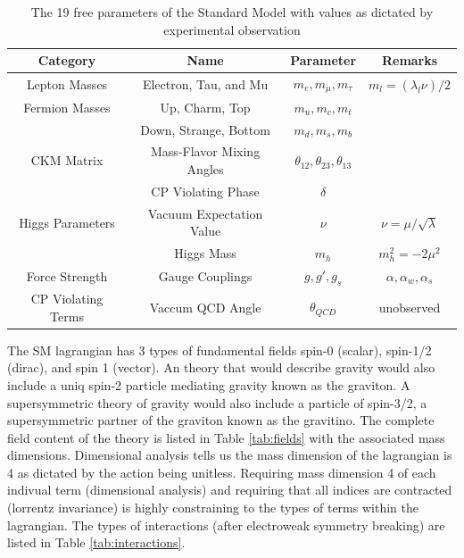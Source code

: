 \begin{center}
\begin{table}[]
\begin{center}
\caption{The 19 free parameters of the Standard Model with values as dictated by experimental observation}
\begin{tabular}{cccc}
\textbf{Category} & \textbf{Name} & \textbf{Parameter} & \textbf{Remarks} \\
\hline
Lepton Masses & Electron, Tau, and Mu  & $m_e,m_\mu,m_\tau$ & $m_l = (\lambda_l \nu)/2$ \\
Fermion Masses & Up, Charm, Top & $m_u, m_c, m_t$ & \\ 
   & Down, Strange, Bottom & $m_d, m_s, m_b$ & \\
\hline
CKM Matrix & Mass-Flavor Mixing Angles & $\theta_{12},\theta_{23},\theta_{13}$ & \\ 
 & CP Violating Phase  & $\delta$ & \\ 
\hline
Higgs Parameters & Vacuum Expectation Value &  $\nu$ & $\nu= \mu / \sqrt{\lambda}$   \\
& Higgs Mass & $m_{h}$ &   $m_h^2 = -2\mu^2$  \\
\hline
Force Strength & Gauge Couplings & $g, g', g_s$ & $\alpha, \alpha_w, \alpha_s$  \\ 
\hline
CP Violating Terms & Vaccum QCD Angle  & $\theta_{QCD}$ &  unobserved \\
\hline
\end{tabular}
\end{center}
\label{tab:free_param}
\end{table}
\end{center}


The SM lagrangian has 3 types of fundamental fields spin-0 (scalar), spin-1/2 (dirac), and spin 1 (vector). 
An theory that would describe gravity would also include a uniq spin-2 particle mediating gravity known
as the graviton. A supersymmetric theory of gravity would also include a particle of spin-3/2,
 a supersymmetric partner of the graviton known as the gravitino.  The complete field
content of the theory is listed in Table \ref{tab:fields} with the
 associated mass dimensions. Dimensional analysis tells
us the mass dimension of the lagrangian is 4 as dictated by the action being unitless. Requiring mass dimension
4 of each indivual term (dimensional analysis) and requiring that all indices are contracted (lorrentz invariance) is highly constraining to the types of terms within the lagrangian. 
The types of interactions (after electroweak symmetry breaking) are listed 
in Table \ref{tab:interactions}. 

